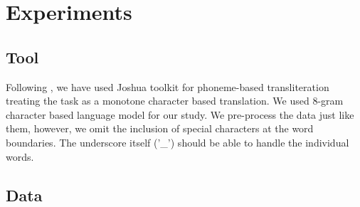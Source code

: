 \documentclass[11pt,a4paper]{article}
\begin{document}
\section{Experiments}

\subsection{Tool}
Following \citet{burch-1}, we have used Joshua toolkit for phoneme-based transliteration treating the task as a monotone character based translation. We used 8-gram character based language model for our study. We pre-process the data just like them, however, we omit the inclusion of special characters at the word boundaries. The underscore itself ('\_') should be able to handle the individual words.

\subsection{Data}
\end{document}
